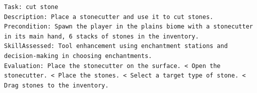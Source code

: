 \begin{lstlisting}
Task: cut stone
Description: Place a stonecutter and use it to cut stones. 
Precondition: Spawn the player in the plains biome with a stonecutter in its main hand, 6 stacks of stones in the inventory. 
SkillAssessed: Tool enhancement using enchantment stations and decision-making in choosing enchantments.
Evaluation: Place the stonecutter on the surface. < Open the stonecutter. < Place the stones. < Select a target type of stone. < Drag stones to the inventory. 

\end{lstlisting}


